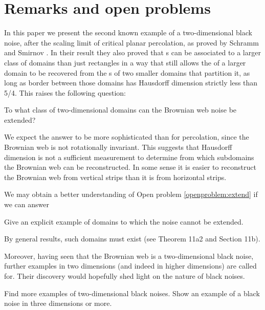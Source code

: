 {
\section{Remarks and open problems}

\label{sec:open-problems}

In this paper we present the second known example of a two-dimensional
black noise, after the scaling limit of critical planar percolation,
as proved by Schramm and Smirnov \cite{schramm-smirnov}.  In their result they also proved
that \sigfield{}s can be associated to a larger class of domains than
just rectangles in a way that still allows the \sigfield{} of a larger
domain to be recovered from the \sigfield{}s of two smaller domains
that partition it, as long as border between those domains has
Hausdorff dimension strictly less than 5/4.
This raises the following question:

\begin{openproblem}
  \label{openproblem:extend}
  To what class of two-dimensional domains can the Brownian web noise be extended?
\end{openproblem}

We expect the answer to be more sophisticated than for percolation,
since the Brownian web is not rotationally invariant.  
This suggests that Hausdorff dimension is not a sufficient measurement
to determine from which subdomains the Brownian web can be
reconstructed.  In some sense it is easier to reconstruct the Brownian
web from vertical strips than it is from horizontal strips.

We may obtain a better understanding of Open problem
\ref{openproblem:extend} if we can answer

\begin{openproblem}
  Give an explicit example of domains to which the noise
  cannot be extended.
\end{openproblem}

By general results, such domains must exist (see
\cite{tsirelson-nonclassical-stochastic-flows} Theorem 11a2 and
Section 11b).

Moreover, having seen that the Brownian web is a two-dimensional black
noise, further examples in two dimensions (and indeed in higher
dimensions) are called for.  Their
discovery would hopefully shed light on the nature of black noises.

\begin{openproblem}
  Find more examples of two-dimensional black noises.  Show an example
  of a black noise in three dimensions or more.
\end{openproblem}
}
